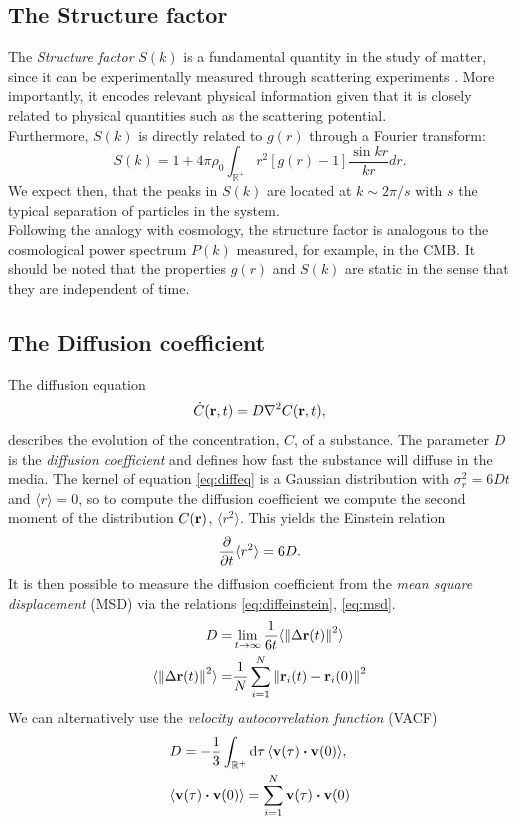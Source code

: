 \documentclass[%
aps,
pra,%
amsmath,amssymb,
preprint,%
reprint,%
notitlepage,
a4paper]{revtex4-1}
\newcommand{\average}[1]{\langle #1 \rangle}
\begin{document}
\subsection{The Structure factor \label{sec:structurefactor}}
The \textit{Structure factor} $S(k)$ is a fundamental quantity in the study of matter, since it can be experimentally measured through scattering experiments \cite{Simon2013}. More importantly, it encodes relevant physical information given that it is closely related to physical quantities such as the scattering potential.\\
Furthermore, $S(k)$ is directly related to $g(r)$ through a Fourier transform:
\begin{equation}
S(k) = 1 + 4\pi\rho_0\int_{\mathbb{R}^+}r^2 [g(r) - 1] \frac{\sin kr}{kr} dr.
\label{eq:sofk}
\end{equation}
We expect then, that the peaks in $S(k)$ are located at $k\sim 2\pi/s$ with $s$ the typical separation of particles in the system.\\
Following the analogy with cosmology, the structure factor is analogous to the cosmological power spectrum $P(k)$ measured, for example, in the CMB\cite{Peebles1980}.
It should be noted that the properties $g(r)$ and $S(k)$ are static in the sense that they are independent of time.
\subsection{The Diffusion coefficient \label{sec:diffcoeff}}
The diffusion equation
\begin{equation}
\dot{C}(\vb{r}, t) = D\nabla^2C(\vb{r}, t),
\label{eq:diffeq}
\end{equation}
describes the evolution of the concentration, $C$, of a substance. The parameter $D$ is the \textit{diffusion coefficient} and defines how fast the substance will diffuse in the media. The kernel of equation \ref{eq:diffeq} is a Gaussian distribution with $\sigma_r^2 = 6Dt$ and $\langle r\rangle=0$, so to compute the diffusion coefficient we compute the second moment of the distribution $C(\vb{r})$, $\langle r^2\rangle$. This yields the Einstein relation\cite{Einstein1905}
\begin{equation}
\pdv{t}\langle r^2\rangle = 6D.
\end{equation}
It is then possible to measure the diffusion coefficient from the \textit{mean square displacement} (MSD) via the relations \ref{eq:diffeinstein}, \ref{eq:msd}.
\begin{align}
\label{eq:diffeinstein}
D =& \lim_{t\rightarrow\infty} \frac{1}{6t}\langle\norm{\Delta\vb{r}(t)}^2\rangle\\
\label{eq:msd}
\langle\norm{\Delta\vb{r}(t)}^2\rangle =& \frac{1}{N}\sum_{i = 1}^{N}\norm{ \vb{r}_i(t) - \vb{r}_i(0)}^2
\end{align}
We can alternatively use the \textit{velocity autocorrelation function} (VACF)\cite{Kubo1957}
\begin{align}
\label{eq:diffvacf}
&D = -\frac{1}{3}\int_{\mathbb{R}^+}\dd{\tau} \langle \vb{v}(\tau)\dotproduct\vb{v}(0)\rangle,\\
&\average{\vb{v}(\tau)\dotproduct\vb{v}(0)} = \sum_{i = 1}^N \vb{v}(\tau)\dotproduct\vb{v}(0)
\end{align}
\end{document}
